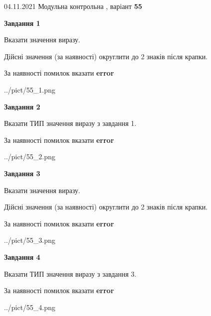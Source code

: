 \documentclass[11pt, ukrainian]{article}
\begin{document}
{04.11.2021 Модульна контрольна , варіант  \No \textbf { 55 }\par}
{
\begin {large}
{\begin {center}\textbf{Завдання 1}\end {center}}\par
Вказати значення виразу. \par
Дійсні значення (за наявності) округлити до 2 знаків після крапки. \par
За наявності помилок вказати \textbf{error}

\begin{center}
	{../pict/55_1.png}
\end{center}
\newpage

{\begin {center}\textbf{Завдання 2}\end {center}}\par
Вказати ТИП значення виразу з завдання 1. \par
За наявності помилок вказати \textbf{error}

\begin{center}
	{../pict/55_2.png}
\end{center}
\newpage

{\begin {center}\textbf{Завдання 3}\end {center}}\par
Вказати значення виразу. \par
Дійсні значення (за наявності) округлити до 2 знаків після крапки. \par
За наявності помилок вказати \textbf{error}

\begin{center}
	{../pict/55_3.png}
\end{center}
\newpage

{\begin {center}\textbf{Завдання 4}\end {center}}\par
Вказати ТИП значення виразу з завдання 3. \par
За наявності помилок вказати \textbf{error}

\begin{center}
	{../pict/55_4.png}
\end{center}
\newpage


\end{large}}
\end{document}
